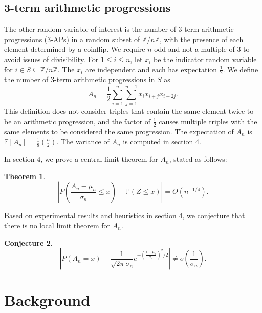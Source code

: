 \documentclass[12pt]{article} %
\newcommand{\f}[2]{\frac{#1}{#2}}
\newcommand{\p}[1]{\left(#1\right)}
\newcommand{\abs}[1]{\left\lvert#1\right\rvert}
\renewcommand{\P}{\mathbb{P}}
\newcommand{\E}{\mathbb{E}}
\newcommand{\Z}{\mathbb{Z}}
\newtheorem{thm}{Theorem}[section]
\theoremstyle{definition}
\newtheorem{conj}[thm]{Conjecture}
\theoremstyle{definition}
\begin{document}
\subsection{3-term arithmetic progressions}

The other random variable of interest is the number of 3-term arithmetic progressions (3-APs) in a random subset of $\Z/n\Z$, with the presence of each element determined by a coinflip. We require $n$ odd and not a multiple of 3 to avoid issues of divisibility. For $1 \leq i \leq n$, let $x_i$ be the indicator random variable for $i \in S \subseteq \Z/n\Z$. The $x_i$ are independent and each has expectation $\f{1}{2}$. We define the number of 3-term arithmetic progressions in $S$ as
\[ A_n = \f{1}{2} \sum_{i=1}^{n} \sum_{j=1}^{n-1} x_i x_{i+j} x_{i+2j}. \]
This definition does not consider triples that contain the same element twice to be an arithmetic progression, and the factor of $\f{1}{2}$ causes multiple triples with the same elements to be considered the same progression. The expectation of $A_n$ is $\E[A_n] = \f{1}{8}\binom{n}{2}$. The variance of $A_n$ is computed in section 4.

In section 4, we prove a central limit theorem for $A_n$, stated as follows:
\begin{thm}
\label{thm:clt-an}
$$\abs{P\p{\frac{A_n - \mu_n}{\sigma_n} \leq x} - \P(Z \leq x)} = O\p{n^{-1/4}}.$$
\end{thm}

Based on experimental results and heuristics in section 4, we conjecture that there is no local limit theorem for $A_n$.
\begin{conj}
\label{conj:llt-an}
$$\abs{P\p{A_n = x} - \f{1}{\sqrt{2\pi}\sigma_n} e^{-\p{\f{x - \mu_n}{\sigma_n}}^2/2}} \neq o\p{\frac{1}{\sigma_n}}.$$
\end{conj}


\section{Background}
\end{document}
